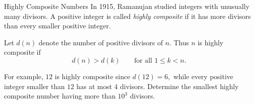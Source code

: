 \begin{problem}{Highly Composite Numbers}
    In 1915, Ramanujan studied integers with unusually many divisors. A positive integer is called \emph{highly composite} if it has more divisors than every smaller positive integer.

    Let \(d(n)\) denote the number of positive divisors of \(n\). Thus \(n\) is highly composite if
    \[
    d(n) > d(k)
    \qquad \text{for all } 1 \le k < n.
    \]

    For example, \(12\) is highly composite since \(d(12)=6,\) while every positive integer smaller than \(12\) has at most \(4\) divisors. Determine the smallest highly composite number having more than \(10^3\) divisors.
    
\end{problem}
